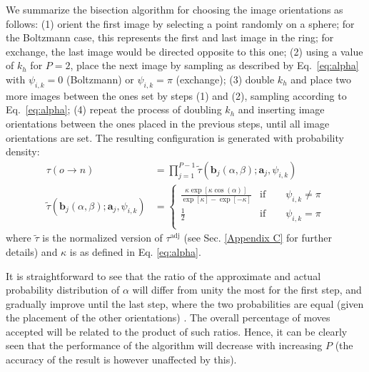 We summarize the bisection algorithm for choosing the image orientations as follows: (1) orient the first image by selecting a point randomly on a sphere; for the Boltzmann case, this represents the first and last image in the ring; for exchange, the last image would be directed opposite to this one; (2) using a value of $k_h$ for $P = 2$, place the next image by sampling as described by Eq.~\ref{eq:alpha} with $\psi_{i,k} = 0$ (Boltzmann) or $\psi_{i,k} = \pi$ (exchange); (3) double $k_h$ and place two more images between the ones set by steps (1) and (2), sampling according to Eq.~\ref{eq:alpha}; (4) repeat the process of doubling $k_h$ and inserting image orientations between the ones placed in the previous steps, until all image orientations are set. The resulting configuration is generated with probability density:
        \begin{equation}
        \label{eq:piTilde}
            \begin{aligned}
                \tau (o \to n) &= \displaystyle\prod_{j=1}^{P-1} \tilde \tau({\mathbf b}_j (\alpha, \beta); {\mathbf a}_j, \psi_{i,k}) \\
                \tilde \tau({\mathbf b}_j (\alpha, \beta); {\mathbf a}_j, \psi_{i,k})  &= 
                \begin{cases}
                    \displaystyle\frac{\kappa \exp[\kappa \cos (\alpha)]}{\exp[\kappa] - \exp[-\kappa]} & \text{if} \qquad \psi_{i,k} \ne \pi\\
                    \displaystyle\frac{1}{2} & \text{if} \qquad \psi_{i,k} = \pi\\
                \end{cases}
            \end{aligned}
        \end{equation}
        where $\tilde \tau$ is the normalized version of $\tau^\text{adj}$ (see Sec. \ref{Appendix C} for further details) and $\kappa$ is as defined in Eq. \eqref{eq:alpha}.

            It is straightforward to see that the ratio of the approximate and actual probability distribution of $\alpha$ will differ from unity the most for the first step, and gradually improve until the last step, where the two probabilities are equal (given the placement of the other orientations) . The overall percentage of moves accepted will be related to the product of such ratios. Hence, it can be clearly seen that the performance of the algorithm will decrease with increasing $P$ (the accuracy of the result is however unaffected by this).
    
